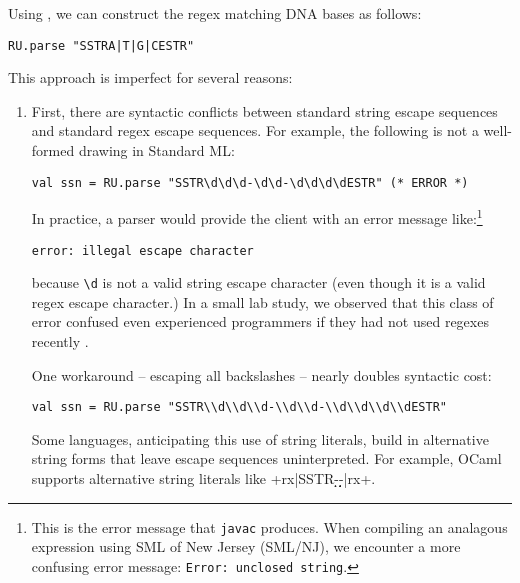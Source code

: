 Using , we can construct the regex matching DNA bases  as follows:
\begin{lstlisting}[numbers=none]
RU.parse "SSTRA|T|G|CESTR"
\end{lstlisting}
This approach is imperfect for several reasons:
\begin{enumerate} 
\item First, there are syntactic conflicts between standard string escape sequences and standard regex escape sequences. For example, the following is not a well-formed drawing in Standard ML:
\begin{lstlisting}[numbers=none,mathescape=|]
val ssn = RU.parse "SSTR\d\d\d-\d\d-\d\d\d\dESTR" (* ERROR *)
\end{lstlisting}
In practice, a parser would provide the client with an error message like:\footnote{This is the error message that \texttt{javac} produces. When compiling an analagous expression using SML of New Jersey (SML/NJ), we encounter a more confusing error message: \texttt{Error: unclosed string}.}
\begin{lstlisting}[numbers=none]
error: illegal escape character
\end{lstlisting}
because \verb|\d| is not a valid string escape character (even though it is a valid regex escape character.) In a small lab study, we observed that this class of error confused even experienced programmers if they had not used regexes recently \cite{Omar:2012:ACC:2337223.2337324}. 

One workaround -- escaping all backslashes -- nearly doubles syntactic cost:
\begin{lstlisting}[numbers=none]
val ssn = RU.parse "SSTR\\d\\d\\d-\\d\\d-\\d\\d\\d\\dESTR"
\end{lstlisting}

Some languages, anticipating this use of string literals, build in alternative string forms that leave escape sequences uninterpreted. For example, OCaml supports alternative string literals like \li+{rx|SSTR\d\d\d-\d\d-\d\d\d\dESTR|rx}+.


\end{enumerate}
